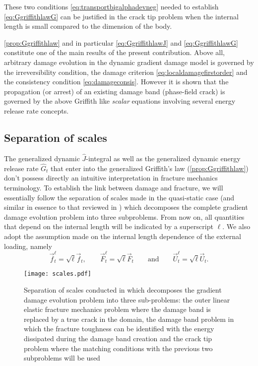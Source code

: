 \begin{remark}
These two conditions \eqref{eq:transportbigalphadevneg} needed to establish \eqref{eq:GgriffithlawG} can be justified in the crack tip problem when the internal length is small compared to the dimension of the body.
\end{remark}

\begin{remark}
\cref{prop:Ggriffithlaw} and in particular \eqref{eq:GgriffithlawJ} and \eqref{eq:GgriffithlawG} constitute one of the main results of the present contribution. Above all, arbitrary damage evolution in the dynamic gradient damage model is governed by the irreversibility condition, the damage criterion \eqref{eq:localdamagefirstorder} and the consistency condition \eqref{eq:damageconsis}. However it is shown that the propagation (or arrest) of an existing damage band (phase-field crack) is governed by the above Griffith like \emph{scalar} equations involving several energy release rate concepts.
\end{remark}

\subsection{Separation of scales} \label{sec:asymptotic}
The generalized dynamic $\widehat{J}$-integral as well as the generalized dynamic energy release rate $\widehat{G}_t$ that enter into the generalized Griffith's law (\cref{prop:Ggriffithlaw}) don't possess directly an intuitive interpretation in fracture mechanics terminology. To establish the link between damage and fracture, we will essentially follow the separation of scales made in the quasi-static case \cite{SicsicMarigo:2013} (and similar in essence to that reviewed in \cite{HakimKarma:2009}) which decomposes the complete gradient damage evolution problem into three subproblems. From now on, all quantities that depend on the internal length will be indicated by a superscript $\ell$. We also adopt the assumption made on the internal length dependence of the external loading, namely
\begin{equation} \label{eq:loadingell}
\vec{f}_t^\ell=\sqrt{\ell}\vec{f}_t,\qquad\vec{F}_t^\ell=\sqrt{\ell}\vec{F}_t\qquad\text{and}\qquad\vec{U}_t^\ell=\sqrt{\ell}\vec{U}_t.
\end{equation}
\begin{figure}[htbp]
\centering
\texttt{[image: scales.pdf]}
\caption{Separation of scales conducted in \cite{SicsicMarigo:2013} which decomposes the gradient damage evolution problem into three sub-problems: the outer linear elastic fracture mechanics problem where the damage band is replaced by a true crack in the domain, the damage band problem in which the fracture toughness can be identified with the energy dissipated during the damage band creation and the crack tip problem where the matching conditions with the previous two subproblems will be used}
\end{figure}

